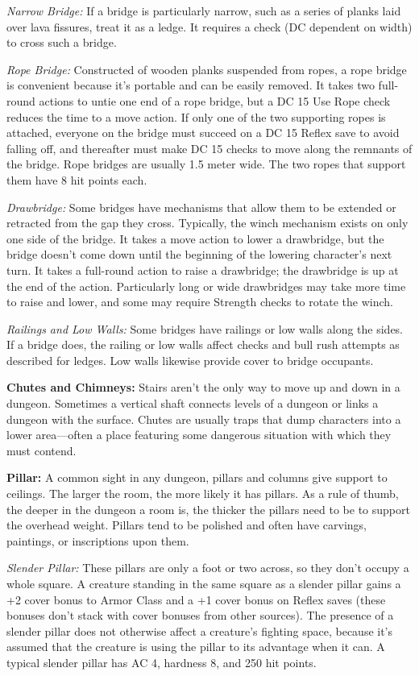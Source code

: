 \textit{Narrow Bridge:} If a bridge is particularly narrow, such as a series of planks laid over lava fissures, treat it as a ledge. It requires a  check (DC dependent on width) to cross such a bridge.

\textit{Rope Bridge:} Constructed of wooden planks suspended from ropes, a rope bridge is convenient because it's portable and can be easily removed. It takes two full-round actions to untie one end of a rope bridge, but a DC 15 Use Rope check reduces the time to a move action. If only one of the two supporting ropes is attached, everyone on the bridge must succeed on a DC 15 Reflex save to avoid falling off, and thereafter must make DC 15  checks to move along the remnants of the bridge. Rope bridges are usually 1.5 meter wide. The two ropes that support them have 8 hit points each.

\textit{Drawbridge:} Some bridges have mechanisms that allow them to be extended or retracted from the gap they cross. Typically, the winch mechanism exists on only one side of the bridge. It takes a move action to lower a drawbridge, but the bridge doesn't come down until the beginning of the lowering character's next turn. It takes a full-round action to raise a drawbridge; the drawbridge is up at the end of the action. Particularly long or wide drawbridges may take more time to raise and lower, and some may require Strength checks to rotate the winch.

\textit{Railings and Low Walls:} Some bridges have railings or low walls along the sides. If a bridge does, the railing or low walls affect  checks and bull rush attempts as described for ledges. Low walls likewise provide cover to bridge occupants.

\textbf{Chutes and Chimneys:} Stairs aren't the only way to move up and down in a dungeon. Sometimes a vertical shaft connects levels of a dungeon or links a dungeon with the surface. Chutes are usually traps that dump characters into a lower area---often a place featuring some dangerous situation with which they must contend.

\textbf{Pillar:} A common sight in any dungeon, pillars and columns give support to ceilings. The larger the room, the more likely it has pillars. As a rule of thumb, the deeper in the dungeon a room is, the thicker the pillars need to be to support the overhead weight. Pillars tend to be polished and often have carvings, paintings, or inscriptions upon them.

\textit{Slender Pillar:} These pillars are only a foot or two across, so they don't occupy a whole square. A creature standing in the same square as a slender pillar gains a +2 cover bonus to Armor Class and a +1 cover bonus on Reflex saves (these bonuses don't stack with cover bonuses from other sources). The presence of a slender pillar does not otherwise affect a creature's fighting space, because it's assumed that the creature is using the pillar to its advantage when it can. A typical slender pillar has AC 4, hardness 8, and 250 hit points.

